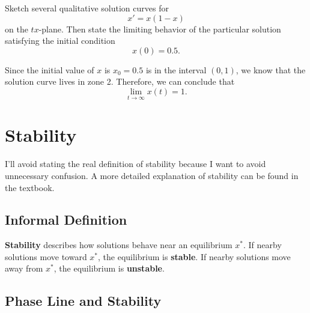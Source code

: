 \documentclass[09pt,letterpaper]{article}
\begin{document}
\begin{example}[5]{
Sketch several qualitative solution curves for
$$
x' = x(1-x)
$$
on the $tx$-plane. Then state the limiting behavior of the particular solution satisfying the initial condition
$$
x(0)=0.5.
$$
}
\begin{figure}[H]
\end{figure}
Since the initial value of $x$ is $x_0=0.5$ is in the interval $(0,1)$, we know that the solution curve lives in zone 2. Therefore, we can conclude that 
$$
\boxed{
\lim_{t\to\infty} x(t)= 1.
}
$$
\end{example}


\section{Stability}
I'll avoid stating the real definition of stability because I want to avoid unnecessary confusion. A more detailed explanation of stability can be found in the textbook.

\subsection{Informal Definition}
\textbf{Stability} describes how solutions behave near an equilibrium $x^*$. If nearby solutions move toward $x^*$, the equilibrium is \textbf{stable}.  If nearby solutions move away from $x^*$, the equilibrium is \textbf{unstable}.

\subsection{Phase Line and Stability}
\end{document}
